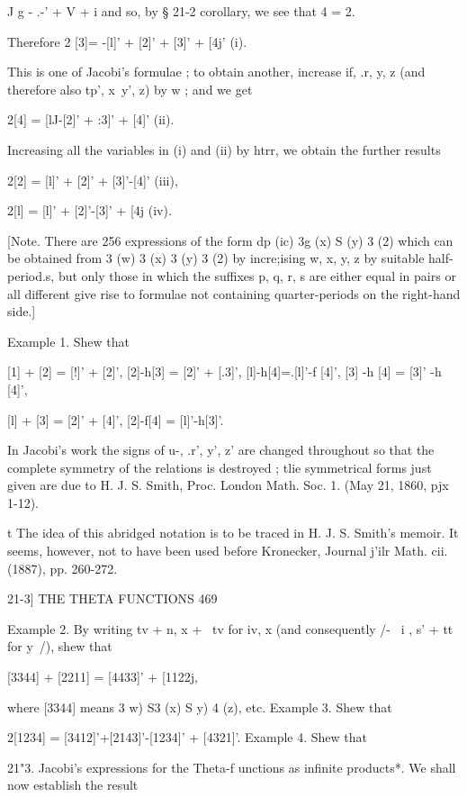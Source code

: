 J g - .-' + V + i and so, by § 21-2 corollary, we see that 4 = 2.

Therefore 2 [3]= -[l]' + [2]' + [3]' + [4j' (i).

This is one of Jacobi's formulae ; to obtain another, increase if, .r,
y, z (and therefore also tp', x\ y', z) by w ; and we get

2[4] = [lJ-[2]' + :3]' + [4]' (ii).

Increasing all the variables in (i) and (ii) by htrr, we obtain the
further results

2[2] = [l]' + [2]' + [3]'-[4]' (iii),

2[l] = [l]' + [2]'-[3]' + [4j (iv).

[Note. There are 256 expressions of the form dp (ic) 3g (x) S (y) 3
(2) which can be obtained from 3 (w) 3 (x) 3 (y) 3 (2) by incre;ising
w, x, y, z by suitable half-period.s, but only those in which the
suffixes p, q, r, s are either equal in pairs or all different give
rise to formulae not containing quarter-periods on the right-hand
side.]

Example 1. Shew that

[1] + [2] = [!]' + [2]', [2]-h[3] = [2]' + [.3]', [l]-h[4]=.[l]'-f
[4]', [3] -h [4] = [3]' -h [4]',

[l] + [3] = [2]' + [4]', [2]-f[4] = [l]'-h[3]'.

In Jacobi's work the signs of u-, .r', y', z' are changed throughout
so that the complete symmetry of the relations is destroyed ; tlie
symmetrical forms just given are due to H. J. S. Smith, Proc. London
Math. Soc. 1. (May 21, 1860, pjx 1-12).

t The idea of this abridged notation is to be traced in H. J. S.
Smith's memoir. It seems, however, not to have been used before
Kronecker, Journal j'ilr Math. cii. (1887), pp. 260-272.



21-3] THE THETA FUNCTIONS 469

Example 2. By writing tv + n, x + \ tv for iv, x (and consequently /-
\ i , s' + tt for y\ /), shew that

[3344] + [2211] = [4433]' + [1122j,

where [3344] means 3 w) S3 (x) S y) 4 (z), etc. Example 3. Shew that

2[1234] = [3412]'+[2143]'-[1234]' + [4321]'. Example 4. Shew that

21"3. Jacobi's expressions for the Theta-f unctions as infinite
products*. We shall now establish the result


